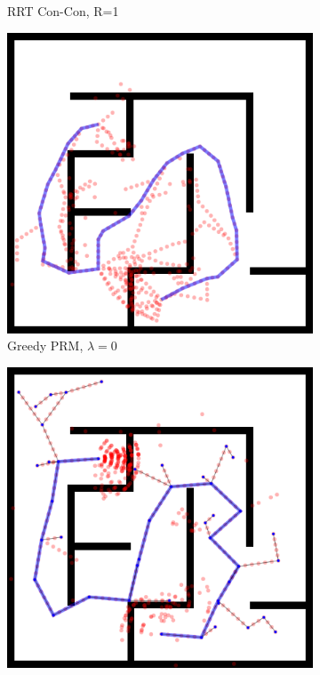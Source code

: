 \documentclass{report}
\begin{document}
\begin{figure}
\begin{subfigure}[b]{0.3\textwidth}
\caption{RRT Con-Con, R=1}
\end{subfigure}%
\quad
\begin{subfigure}[b]{0.3\textwidth}
\includegraphics[width=\textwidth]{figs/compare-2d-rrtc1-checkmask-l00-s1.png}
\caption{Greedy PRM, $\lambda=0$}
\end{subfigure}%
\vspace{0.05in}
\begin{subfigure}[b]{0.3\textwidth}
\includegraphics[width=\textwidth]{figs/compare-2d-rrtc1-rrtextcon-r6-s1.png}

\end{subfigure}
\end{figure}
\end{document}
